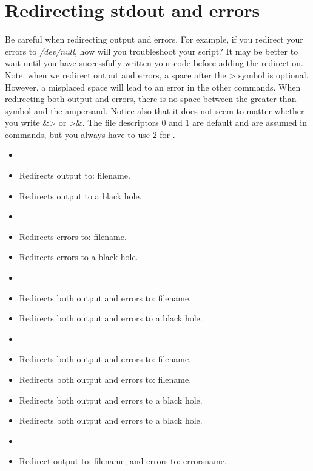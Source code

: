 \section{Redirecting stdout and errors}

Be careful when redirecting output and errors. For example, if you redirect your errors to \textsl{/dev/null}, how will you troubleshoot your script? It may be better to wait until you have successfully written your code before adding the redirection. Note, when we redirect output and errors, a space after the > symbol is optional. However, a misplaced space will lead to an error in the other commands. When redirecting both output and errors, there is no space between the greater than symbol and the ampersand.  Notice also that it does not seem to matter whether you write \&> or >\&. The file descriptors 0 and 1 are default and are assumed in commands, but you always have to use 2 for .

\begin{itemize}
	\item[]  
	\item[]  Redirects output to: filename.
	\item[]  Redirects output to a black hole.
	\item[] 
	\item[]  Redirects errors to: filename.
	\item[]  Redirects errors to a black hole.
	\item[] 
	\item[]  Redirects both output and errors to: filename.	
	\item[]  Redirects both output and errors to a black hole.
	\item[] 
	\item[]  Redirects both output and errors to: filename.
	\item[]  Redirects both output and errors to: filename.
	\item[]  Redirects both output and errors to a black hole.
	\item[]  Redirects both output and errors to a black hole.
	\item[]  
	\item[]  Redirect output to: filename; and errors to: errorsname.	
\end{itemize}


